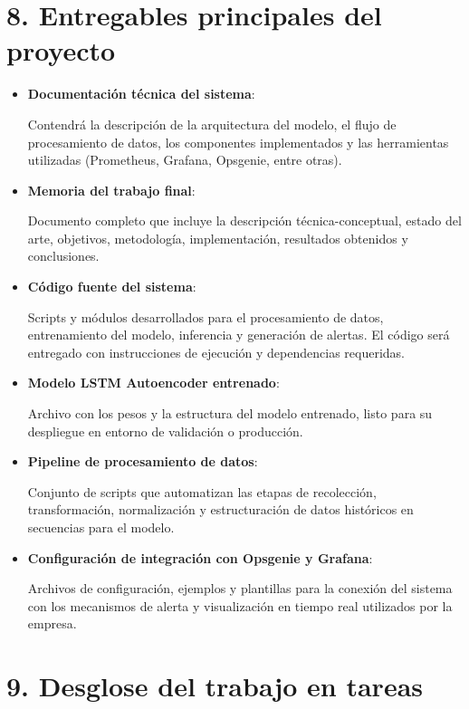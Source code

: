 \documentclass[
11pt, %
]{charter}
\begin{document}
\section{8. Entregables principales del proyecto}
\label{sec:entregables}

\begin{itemize}
    \item \textbf{Documentación técnica del sistema}:

 Contendrá la descripción de la arquitectura del modelo, el flujo de procesamiento de datos, los componentes implementados y las herramientas utilizadas (Prometheus, Grafana, Opsgenie, entre otras).
    \item \textbf{Memoria del trabajo final}:

 Documento completo que incluye la descripción técnica-conceptual, estado del arte, objetivos, metodología, implementación, resultados obtenidos y conclusiones.
    \item \textbf{Código fuente del sistema}:

 Scripts y módulos desarrollados para el procesamiento de datos, entrenamiento del modelo, inferencia y generación de alertas. El código será entregado con instrucciones de ejecución y dependencias requeridas.
    \item \textbf{Modelo LSTM Autoencoder entrenado}:

 Archivo con los pesos y la estructura del modelo entrenado, listo para su despliegue en entorno de validación o producción.
    \item \textbf{Pipeline de procesamiento de datos}:

 Conjunto de scripts que automatizan las etapas de recolección, transformación, normalización y estructuración de datos históricos en secuencias para el modelo.
    \item \textbf{Configuración de integración con Opsgenie y Grafana}:

 Archivos de configuración, ejemplos y plantillas para la conexión del sistema con los mecanismos de alerta y visualización en tiempo real utilizados por la empresa.
\end{itemize}
    

\section{9. Desglose del trabajo en tareas}
\label{sec:wbs}
\end{document}
